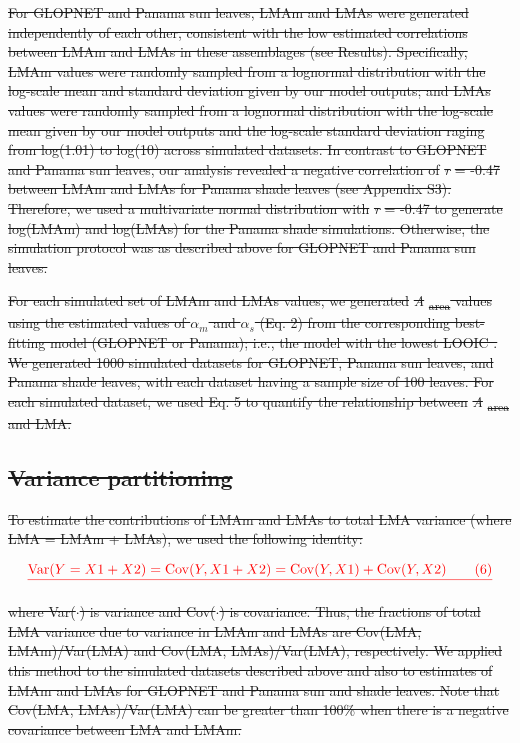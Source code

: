 \documentclass[
  12pt,
  letterpaper,
  DIV=11,
  numbers=noendperiod]{scrartcl}
\providecommand{\DIFdel}[1]{{\protect\color{red}\sout{#1}}}                      %
\begin{document}
\DIFdel{For GLOPNET and Panama sun leaves, LMAm and LMAs were generated
independently of each other, consistent with the low estimated
correlations between LMAm and LMAs in these assemblages (see Results).
Specifically, LMAm values were randomly sampled from a lognormal
distribution with the log-scale mean and standard deviation given by our
model outputs; and LMAs values were randomly sampled from a lognormal
distribution with the log-scale mean given by our model outputs and the
log-scale standard deviation raging from log(1.01) to log(10) across
simulated datasets. In contrast to GLOPNET and Panama sun leaves, our
analysis revealed a negative correlation of }\emph{\DIFdel{r}} %
\DIFdel{= -0.47 between
LMAm and LMAs for Panama shade leaves (see Appendix S3). Therefore, we
used a multivariate normal distribution with }\emph{\DIFdel{r}} %
\DIFdel{= -0.47 to
generate log(LMAm) and log(LMAs) for the Panama shade simulations.
Otherwise, the simulation protocol was as described above for GLOPNET
and Panama sun leaves.
}%

\DIFdel{For each simulated set of LMAm and LMAs values, we generated
}\emph{\DIFdel{A}}%
\DIFdel{\textsubscript{area} values using the estimated values of
\(\alpha_m\) and \(\alpha_s\) (Eq. 2) from the corresponding
best-fitting model (GLOPNET or Panama); i.e., the model with the lowest
LOOIC . We generated 1000 simulated datasets for GLOPNET, Panama sun
leaves, and Panama shade leaves, with each dataset having a sample size
of 100 leaves. For each simulated dataset, we used Eq. 5 to quantify the
relationship between }\emph{\DIFdel{A}}%
\DIFdel{\textsubscript{area} and LMA.
}%

\subsection{\DIFdel{Variance partitioning}}%
\addtocounter{subsection}{-1}%

\DIFdel{To estimate the contributions of LMAm and LMAs to total LMA variance
(where LMA = LMAm + LMAs), we used the following identity:
}%

\[
\DIFdel{\mathrm{Var}(Y = X1 + X2) = \mathrm{Cov}(Y, X1+X2) = \mathrm{Cov}(Y,X1) + \mathrm{Cov}(Y,X2) \qquad(6)
}\]%

\DIFdel{where Var(\(\cdot\)) is variance and Cov(\(\cdot\)) is covariance. Thus,
the fractions of total LMA variance due to variance in LMAm and LMAs are
Cov(LMA, LMAm)/Var(LMA) and Cov(LMA, LMAs)/Var(LMA), respectively. We
applied this method to the simulated datasets described above and also
to estimates of LMAm and LMAs for GLOPNET and Panama sun and shade
leaves. Note that Cov(LMA, LMAs)/Var(LMA) can be greater than 100\% when
there is a negative covariance between LMA and LMAm.
}%
\end{document}
